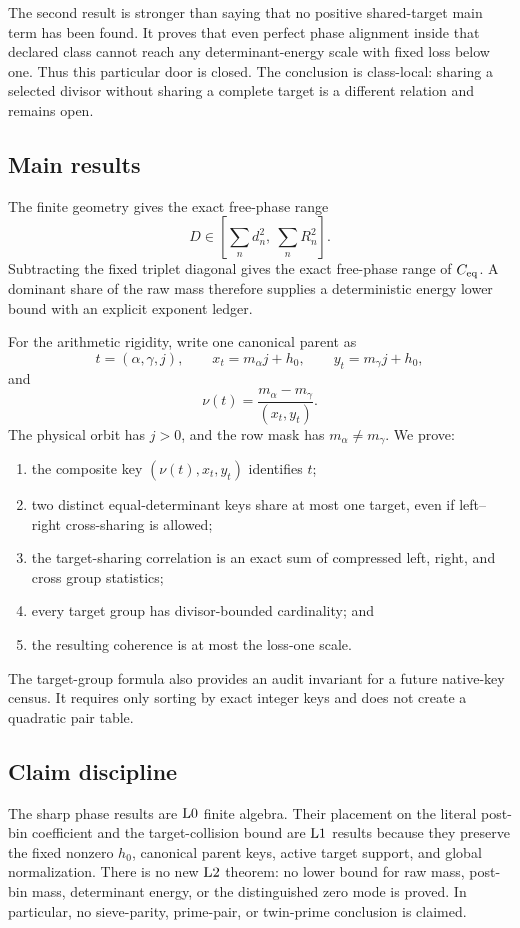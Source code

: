 The second result is stronger than saying that no positive
shared-target main term has been found.  It proves that even perfect
phase alignment inside that declared class cannot reach any
determinant-energy scale with fixed loss below one.  Thus this
particular door is closed.  The conclusion is class-local: sharing a
selected divisor without sharing a complete target is a different
relation and remains open.

\subsection{Main results}

The finite geometry gives the exact free-phase range
\[
 D\in
 \left[
 \sum_nd_n^2,\ \sum_nR_n^2
 \right].
\]
Subtracting the fixed triplet diagonal gives the exact free-phase
range of \(C_{\mathrm{eq}}\).  A dominant share of the raw mass therefore
supplies a deterministic energy lower bound with an explicit exponent
ledger.

For the arithmetic rigidity, write one canonical parent as
\[
 t=(\alpha,\gamma,j),\qquad
 x_t=m_\alpha j+h_0,\qquad
 y_t=m_\gamma j+h_0,
\]
and
\[
 \nu(t)=
 \frac{m_\alpha-m_\gamma}{(x_t,y_t)}.
\]
The physical orbit has \(j>0\), and the row mask has
\(m_\alpha\ne m_\gamma\).  We prove:

\begin{enumerate}[label=(\roman*),leftmargin=2.2em]
\item the composite key \((\nu(t),x_t,y_t)\) identifies \(t\);
\item two distinct equal-determinant keys share at most one target,
  even if left--right cross-sharing is allowed;
\item the target-sharing correlation is an exact sum of compressed
  left, right, and cross group statistics;
\item every target group has divisor-bounded cardinality; and
\item the resulting coherence is at most the loss-one scale.
\end{enumerate}

The target-group formula also provides an audit invariant for a future
native-key census.  It requires only sorting by exact integer keys and
does not create a quadratic pair table.

\subsection{Claim discipline}

The sharp phase results are \(\mathrm{L0}\) finite algebra.  Their placement
on the literal post-bin coefficient and the target-collision bound are
\(\mathrm{L1}\) results because they preserve the fixed nonzero \(h_0\),
canonical parent keys, active target support, and global normalization.
There is no new \(\mathrm{L2}\) theorem: no lower bound for raw mass,
post-bin mass, determinant energy, or the distinguished zero mode is
proved.  In particular, no sieve-parity, prime-pair, or twin-prime
conclusion is claimed.

